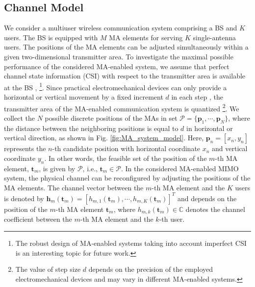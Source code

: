 \documentclass[12pt, draftclsnofoot, onecolumn]{IEEEtran}
\begin{document}
\subsection{Channel Model}
We consider a multiuser wireless communication system comprising a BS and $K$ users. The BS is equipped with $M$ MA elements for serving $K$ single-antenna users. %
The positions of the MA elements can be adjusted simultaneously within a given two-dimensional transmitter area. To investigate the maximal possible performance of the considered MA-enabled system, we assume that perfect channel state information (CSI) with respect to the transmitter area is available at the BS \cite{ma2022mimo}, \cite{zhu2023movable} \footnote{The robust design of MA-enabled systems taking into account imperfect CSI is an interesting topic for future work.}. Since practical electromechanical devices can only provide a horizontal or vertical movement by a fixed increment $d$ in each step \cite{zhuravlev2015experimental}\cite{basbug2017design}, the transmitter area of the MA-enabled communication system is quantized \cite{basbug2017design}\footnote{The value of step size $d$ depends on the precision of the employed electromechanical devices and may vary in different MA-enabled systems. }. We collect the $N$ possible discrete positions of the MAs in set $\mathcal{P}=\{\mathbf{p}_1,\cdots, \mathbf{p}_N\}$, where the distance between the neighboring positions is equal to $d$ in horizontal or vertical direction, as shown in Fig. \ref{fig:MA_system_model}. Here, $\mathbf{p}_n=[x_n,y_n]$ represents the $n$-th candidate position with horizontal coordinate $x_n$ and vertical coordinate $y_n$. 
In other words, the feasible set of the position of the $m$-th MA element, $\mathbf{t}_m$, is given by $\mathcal{P}$, i.e., $\mathbf{t}_m\in\mathcal{P}$. In the considered MA-enabled MIMO system, the physical channel can be reconfigured by adjusting the positions of the MA elements. The channel vector between the $m$-th MA element and the $K$ users is denoted by $\mathbf{h}_m(\mathbf{t}_m)=[h_{m,1}(\mathbf{t}_m),\cdots,h_{m,K}(\mathbf{t}_m)]^T$ and depends on the position of the $m$-th MA element $\mathbf{t}_m$, where $h_{m,k}(\mathbf{t}_m)\in\mathbb{C}$ denotes the channel coefficient between the $m$-th MA element and the $k$-th user.
\end{document}
